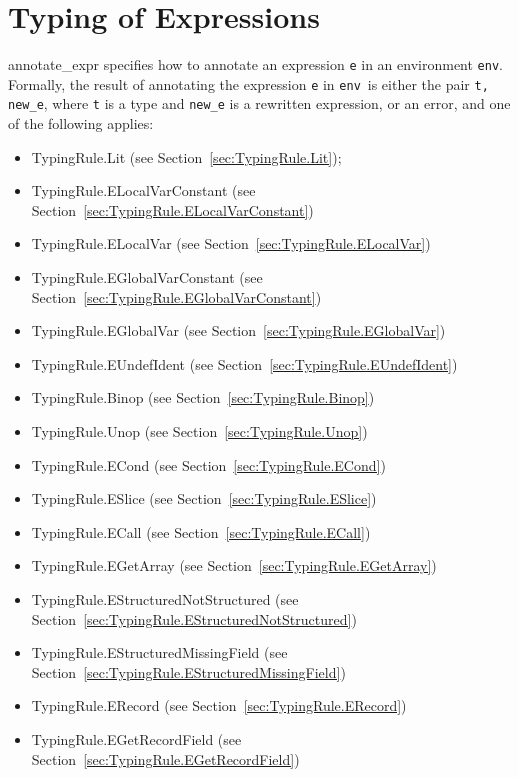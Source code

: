 \documentclass{book}
\newcommand\tenv[0]{\texttt{env}}
\begin{document}
\chapter{Typing of Expressions}

\textsf{annotate\_expr} specifies how to annotate an expression \texttt{e} in
an environment \tenv.  Formally, the result of annotating the expression
\texttt{e} in \tenv\ is either the pair \texttt{t, new\_e}, where \texttt{t} is a type and
\texttt{new\_e} is a rewritten expression, or an error, and one of the following applies:
\begin{itemize}
\item TypingRule.Lit (see Section~\ref{sec:TypingRule.Lit});
\item TypingRule.ELocalVarConstant (see Section~\ref{sec:TypingRule.ELocalVarConstant})
\item TypingRule.ELocalVar (see Section~\ref{sec:TypingRule.ELocalVar})
\item TypingRule.EGlobalVarConstant (see Section~\ref{sec:TypingRule.EGlobalVarConstant})
\item TypingRule.EGlobalVar (see Section~\ref{sec:TypingRule.EGlobalVar})
\item TypingRule.EUndefIdent (see Section~\ref{sec:TypingRule.EUndefIdent})
\item TypingRule.Binop (see Section~\ref{sec:TypingRule.Binop})
\item TypingRule.Unop (see Section~\ref{sec:TypingRule.Unop})
\item TypingRule.ECond (see Section~\ref{sec:TypingRule.ECond})
\item TypingRule.ESlice (see Section~\ref{sec:TypingRule.ESlice})
\item TypingRule.ECall (see Section~\ref{sec:TypingRule.ECall})
\item TypingRule.EGetArray (see Section~\ref{sec:TypingRule.EGetArray})
\item TypingRule.EStructuredNotStructured (see Section~\ref{sec:TypingRule.EStructuredNotStructured})
\item TypingRule.EStructuredMissingField (see Section~\ref{sec:TypingRule.EStructuredMissingField})
\item TypingRule.ERecord (see Section~\ref{sec:TypingRule.ERecord})
\item TypingRule.EGetRecordField (see Section~\ref{sec:TypingRule.EGetRecordField})

\end{itemize}
\end{document}
